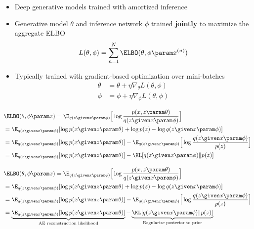  
\begin{frame}
\begin{itemize}
    \item Deep generative models trained with amortized inference
    \item Generative model $\theta$ and inference network $\phi$ trained \textbf{jointly} to maximize the aggregate ELBO
    \[L(\theta, \phi) =  \sum_{n=1}^N \ELBO(\theta, \phi \param x^{(n)})\]
    \item Typically trained with gradient-based optimization over mini-batches
    \begin{align*}
        \theta &= \theta + \eta \nabla_\theta L(\theta, \phi) \\
        \phi &= \phi + \eta \nabla_\phi L(\theta, \phi)
    \end{align*}
\end{itemize}
\end{frame}

\begin{frame}
\begin{align*}
    &\ELBO(\theta, \phi \param x ) = \E_{q(z \given x \param \phi)}\Big[\log \frac{p(x, z \param \theta)}{q(z \given x \param \phi)}\Big] \\
    &= \E_{q(z \given x \param \phi)}[\log p( x \given z \param \theta) + \log p(z) - \log q(z \given x \param \phi)] \\
        &= \E_{q(z \given x \param \phi)}[\log p( x \given z \param \theta)] - \E_{q(z \given x \param \phi)}\Big[\log \frac{q(z \given x \param \phi)}{p(z)} \Big] \\
        &= \E_{q(z \given x \param \phi)}[\log p( x \given z \param \theta)] - \KL[q(z \given x \param \phi) \Vert p(z)]
\end{align*}
\end{frame}


\begin{frame}
\begin{align*}
    &\ELBO(\theta, \phi \param x )  = \E_{q(z \given x \param \phi)}\Big[\log \frac{p(x, z \param \theta)}{q(z \given x \param \phi)}\Big] \\
    &= \E_{q(z \given x \param \phi)}[\log p( x \given z \param \theta) + \log p(z) - \log q(z \given x \param \phi)] \\
        &= \E_{q(z \given x \param \phi)}[\log p( x \given z \param \theta)] - \E_{q(z \given x \param \phi)}\Big[\log \frac{q(z \given x \param \phi)}{p(z)} \Big] \\
        &= \underbrace{\E_{q(z \given x \param \phi)}[\log p( x \given z \param \theta)]}_{\text{AE reconstruction likelihood}} - \underbrace{\KL[q(z \given x \param \phi) \Vert p(z)]}_{\text{Regularize posterior to prior}}
\end{align*}
\end{frame}


